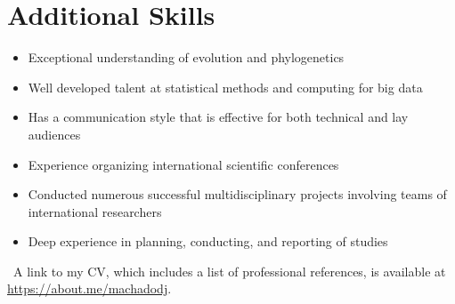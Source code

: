 \section{Additional Skills}
    \begin{itemize}
        \item Exceptional understanding of evolution and phylogenetics
        \item Well developed talent at statistical methods and computing for big data
        \item Has a communication style that is effective for both technical and lay audiences
        \item Experience organizing international scientific conferences
        \item Conducted numerous successful multidisciplinary projects involving teams of international researchers
        \item Deep experience in planning, conducting, and reporting of studies
    \end{itemize}

\vfill

{\color{MyLightBlue}~A link to my CV, which includes a list of professional references, is available at \href{https://about.me/machadodj}{https://about.me/machadodj}.}